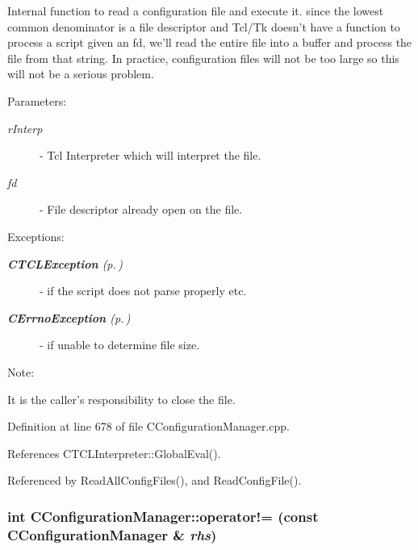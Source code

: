 Internal function to read a configuration file and execute it. since the lowest common denominator is a file descriptor and  Tcl/Tk doesn't have a function to process a script given an fd, we'll read the entire file into a buffer and process the file from that string. In practice, configuration files will not be too large so this will not be a serious problem.\begin{Desc}
\item[Parameters: ]\par
\begin{description}
\item[{\em 
r\-Interp}]- Tcl Interpreter which will interpret the file. \item[{\em 
fd}]- File descriptor already open on the file.\end{description}
\end{Desc}
\begin{Desc}
\item[Exceptions: ]\par
\begin{description}
\item[{\em 
{\bf CTCLException} {\rm (p.\,\pageref{classCTCLException})}}] - if the script does not parse properly etc. \item[{\em 
{\bf CErrno\-Exception} {\rm (p.\,\pageref{classCErrnoException})}}] - if unable to determine file size.\end{description}
\end{Desc}
\begin{Desc}
\item[Note: ]\par
It is the caller's responsibility to close the file. \end{Desc}


Definition at line 678 of file CConfiguration\-Manager.cpp.

References CTCLInterpreter::Global\-Eval().

Referenced by Read\-All\-Config\-Files(), and Read\-Config\-File().
\subsubsection{\setlength{\rightskip}{0pt plus 5cm}int CConfiguration\-Manager::operator!= (const CConfiguration\-Manager \& {\em rhs})\hspace{0.3cm}{\tt  [inline]}}\label{classCConfigurationManager_a6}




